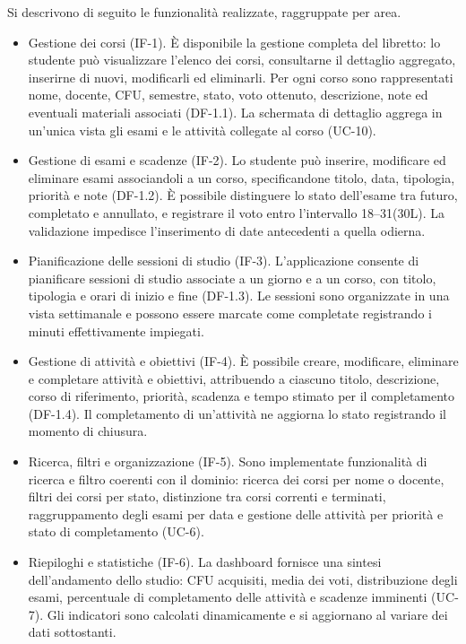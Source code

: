 \documentclass[a4paper, 12pt]{article}
\begin{document}
Si descrivono di seguito le funzionalità realizzate, raggruppate per area.
\begin{itemize}
    \item Gestione dei corsi (IF-1). È disponibile la gestione completa del libretto: lo studente può visualizzare l'elenco dei corsi, consultarne il dettaglio aggregato, inserirne di nuovi, modificarli ed eliminarli. Per ogni corso sono rappresentati nome, docente, CFU, semestre, stato, voto ottenuto, descrizione, note ed eventuali materiali associati (DF-1.1). La schermata di dettaglio aggrega in un'unica vista gli esami e le attività collegate al corso (UC-10).
    \item Gestione di esami e scadenze (IF-2). Lo studente può inserire, modificare ed eliminare esami associandoli a un corso, specificandone titolo, data, tipologia, priorità e note (DF-1.2). È possibile distinguere lo stato dell'esame tra futuro, completato e annullato, e registrare il voto entro l'intervallo 18–31(30L). La validazione impedisce l'inserimento di date antecedenti a quella odierna.
    \item Pianificazione delle sessioni di studio (IF-3). L'applicazione consente di pianificare sessioni di studio associate a un giorno e a un corso, con titolo, tipologia e orari di inizio e fine (DF-1.3). Le sessioni sono organizzate in una vista settimanale e possono essere marcate come completate registrando i minuti effettivamente impiegati.
    \item Gestione di attività e obiettivi (IF-4). È possibile creare, modificare, eliminare e completare attività e obiettivi, attribuendo a ciascuno titolo, descrizione, corso di riferimento, priorità, scadenza e tempo stimato per il completamento (DF-1.4). Il completamento di un'attività ne aggiorna lo stato registrando il momento di chiusura.
    \item Ricerca, filtri e organizzazione (IF-5). Sono implementate funzionalità di ricerca e filtro coerenti con il dominio: ricerca dei corsi per nome o docente, filtri dei corsi per stato, distinzione tra corsi correnti e terminati, raggruppamento degli esami per data e gestione delle attività per priorità e stato di completamento (UC-6).
    \item Riepiloghi e statistiche (IF-6). La dashboard fornisce una sintesi dell'andamento dello studio: CFU acquisiti, media dei voti, distribuzione degli esami, percentuale di completamento delle attività e scadenze imminenti (UC-7). Gli indicatori sono calcolati dinamicamente e si aggiornano al variare dei dati sottostanti.

\end{itemize}
\end{document}
